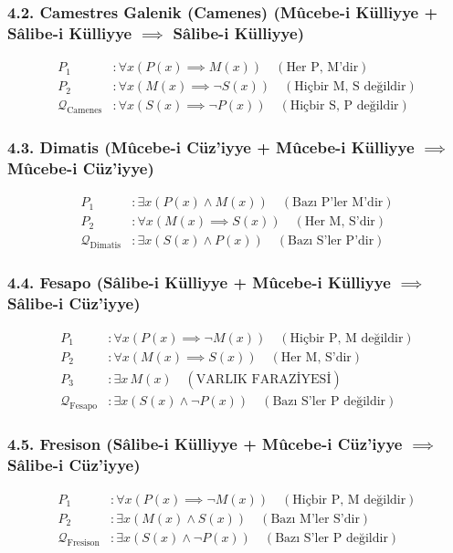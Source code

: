 \documentclass[11pt, a4paper]{article}
\begin{document}
\subsubsection{4.2. Camestres Galenik (Camenes) (Mûcebe-i Külliyye + Sâlibe-i Külliyye $\implies$ Sâlibe-i Külliyye)}
\begin{align}
P_1 &: \forall x (P(x) \implies M(x)) \quad (\text{Her P, M'dir}) \\
P_2 &: \forall x (M(x) \implies \neg S(x)) \quad (\text{Hiçbir M, S değildir}) \\
\mathcal{Q}_{\text{Camenes}} &: \forall x (S(x) \implies \neg P(x)) \quad (\text{Hiçbir S, P değildir})
\end{align}

\subsubsection{4.3. Dimatis (Mûcebe-i Cüz'iyye + Mûcebe-i Külliyye $\implies$ Mûcebe-i Cüz'iyye)}
\begin{align}
P_1 &: \exists x (P(x) \land M(x)) \quad (\text{Bazı P'ler M'dir}) \\
P_2 &: \forall x (M(x) \implies S(x)) \quad (\text{Her M, S'dir}) \\
\mathcal{Q}_{\text{Dimatis}} &: \exists x (S(x) \land P(x)) \quad (\text{Bazı S'ler P'dir})
\end{align}

\subsubsection{4.4. Fesapo (Sâlibe-i Külliyye + Mûcebe-i Külliyye $\implies$ Sâlibe-i Cüz'iyye)}
\begin{align}
P_1 &: \forall x (P(x) \implies \neg M(x)) \quad (\text{Hiçbir P, M değildir}) \\
P_2 &: \forall x (M(x) \implies S(x)) \quad (\text{Her M, S'dir}) \\
P_3 &: \exists x \, M(x) \quad (\text{VARLIK FARAZİYESİ}) \\
\mathcal{Q}_{\text{Fesapo}} &: \exists x (S(x) \land \neg P(x)) \quad (\text{Bazı S'ler P değildir})
\end{align}

\subsubsection{4.5. Fresison (Sâlibe-i Külliyye + Mûcebe-i Cüz'iyye $\implies$ Sâlibe-i Cüz'iyye)}
\begin{align}
P_1 &: \forall x (P(x) \implies \neg M(x)) \quad (\text{Hiçbir P, M değildir}) \\
P_2 &: \exists x (M(x) \land S(x)) \quad (\text{Bazı M'ler S'dir}) \\
\mathcal{Q}_{\text{Fresison}} &: \exists x (S(x) \land \neg P(x)) \quad (\text{Bazı S'ler P değildir})
\end{align}
\end{document}
